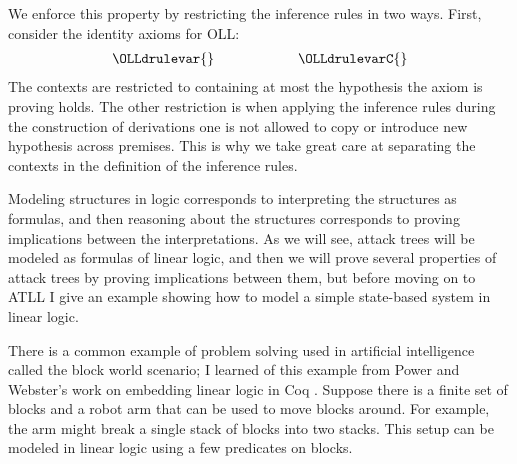 We enforce this property by restricting the inference rules in two
ways. First, consider the identity axioms for OLL:
\[
\begin{array}{lll}
  \OLLdrulevar{} & \quad\quad\quad\quad & \OLLdrulevarC{}
\end{array}
\]
The contexts are restricted to containing at most the hypothesis the
axiom is proving holds.  The other restriction is when applying the
inference rules during the construction of derivations one is not
allowed to copy or introduce new hypothesis across premises.  This is
why we take great care at separating the contexts in the definition of
the inference rules.

Modeling structures in logic corresponds to interpreting the
structures as formulas, and then reasoning about the structures
corresponds to proving implications between the interpretations.  As
we will see, attack trees will be modeled as formulas of linear logic,
and then we will prove several properties of attack trees by proving
implications between them, but before moving on to ATLL I give an
example showing how to model a simple state-based system in linear
logic.

There is a common example of problem solving used in artificial
intelligence called the block world scenario; I learned of this
example from Power and Webster's work on embedding linear logic in Coq
\cite{?}.  Suppose there is a finite set of blocks and a robot arm
that can be used to move blocks around.  For example, the arm might
break a single stack of blocks into two stacks.  This setup can be
modeled in linear logic using a few predicates on blocks.

